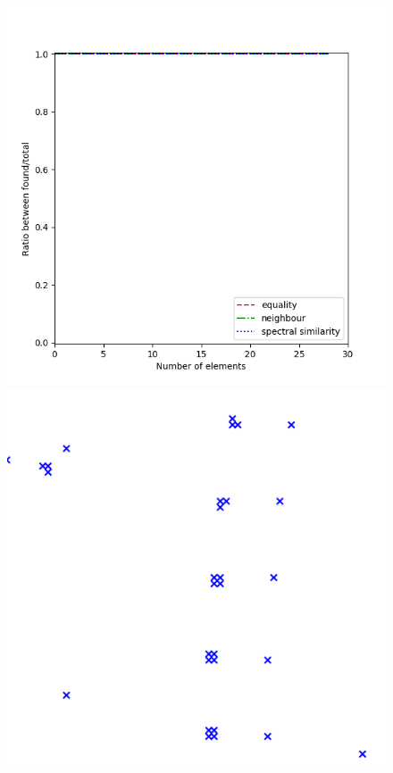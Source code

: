 \begin{figure}[H]
\centering
  \centering
  \includegraphics[width=\linewidth-1.5in]{figures/hydice.png}
\begin{minipage}{.35\textwidth}
  \centering
  \includegraphics[width=\linewidth, frame]{figures/hydice_ref.png}

\end{minipage}
\end{figure}

